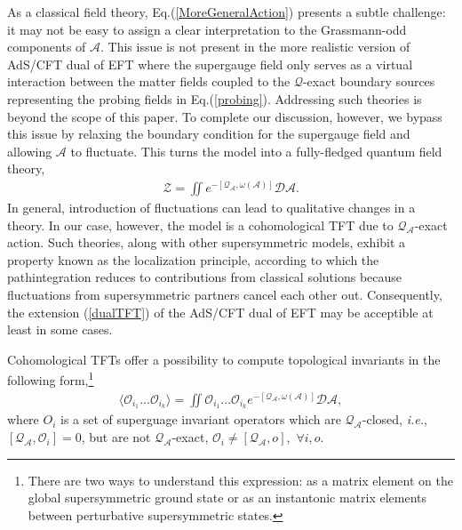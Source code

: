 \documentclass[final,5p,10pt,times,twocolumn,year]{elsarticle}
\begin{document}
As a classical field theory, Eq.(\ref{MoreGeneralAction}) presents a subtle challenge: it may not be easy to assign a clear interpretation to the Grassmann-odd components of $\mathcal A$. This issue is not present in the more realistic version of AdS/CFT dual of EFT where the supergauge field only serves as a virtual interaction between the matter fields coupled to the $\mathcal Q$-exact boundary sources representing the probing fields in Eq.(\ref{probing}). Addressing such theories is beyond the scope of this paper. To complete our discussion, however, we bypass this issue by relaxing the boundary condition for the supergauge field and allowing $\mathcal A$ to fluctuate. This turns the model into a fully-fledged quantum field theory,
\begin{eqnarray}
    \mathcal{Z} = \iint e^{-[\mathcal{Q}_{\mathcal A},\omega({\mathcal A})]} \mathcal D\mathcal{A}.\label{dualTFT}
\end{eqnarray}
In general, introduction of fluctuations can lead to qualitative changes in a theory. In our case, however, the model is a cohomological TFT due to $\mathcal{Q}_{\mathcal A}$-exact action. Such theories, along with other supersymmetric models, exhibit a property known as the localization principle, according to which the pathintegration reduces to contributions from classical solutions because fluctuations from supersymmetric partners cancel each other out. Consequently, the extension (\ref{dualTFT}) of the AdS/CFT dual of EFT may be acceptible at least in some cases.

Cohomological TFTs offer a possibility to compute topological invariants in the following form,\footnote{There are two ways to understand this expression: as a matrix element on the global supersymmetric ground state or as an instantonic matrix elements between perturbative supersymmetric states.}
\begin{eqnarray}
\langle\mathcal{O}_{i_1} ... \mathcal{O}_{i_k}\rangle = \iint \mathcal{O}_{i_1} ... \mathcal{O}_{i_k} e^{-[\mathcal{Q}_{\mathcal A},\omega({\mathcal A})]}\mathcal{D} \mathcal{A},
\label{TopInariants}
\end{eqnarray}
where $O_i$ is a set of superguage invariant operators which are $\mathcal Q_\mathcal{A}$-closed, \emph{i.e.}, $[\mathcal{Q}_{\mathcal A},\mathcal{O}_i] = 0$, but are not $\mathcal Q_\mathcal{A}$-exact, ${\mathcal O}_{i} \ne [{\mathcal Q}_{\mathcal A}, o], $ $\forall i, o$. 
\end{document}
